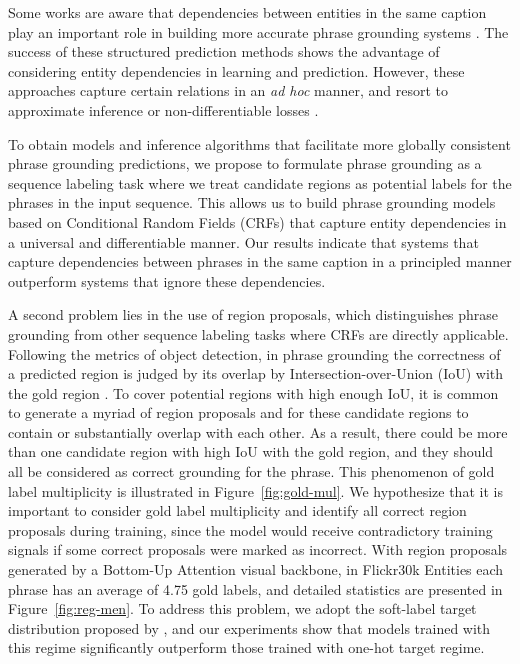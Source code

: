 \documentclass[11pt,a4paper]{article}
\begin{document}
Some works are aware that dependencies between entities in the same caption play an important role in building more accurate phrase grounding systems \cite{DBLP:conf/eccv/WangAKMD16, DBLP:conf/iccv/PlummerMCHL17, DBLP:conf/iccv/ChenKN17}. The success of these structured prediction methods shows the advantage of considering entity dependencies in learning and prediction. However, these approaches capture certain relations in an \textit{ad hoc} manner, and resort to approximate inference \cite{DBLP:conf/eccv/WangAKMD16, DBLP:conf/iccv/PlummerMCHL17} or non-differentiable losses \cite{DBLP:conf/iccv/ChenKN17}. 

To obtain models and inference algorithms that facilitate more globally consistent phrase grounding predictions, we propose to formulate phrase grounding as a sequence labeling task where we treat candidate regions as potential labels for the phrases in the input sequence. This allows us to build phrase grounding models based on Conditional Random Fields (CRFs) \cite{DBLP:conf/icml/LaffertyMP01} that capture entity dependencies in a universal and differentiable manner.  Our results indicate that systems that capture dependencies between phrases in the same caption in a principled manner outperform systems that ignore these dependencies. 

A second problem lies in the use of region proposals, which distinguishes phrase grounding from other sequence labeling tasks where CRFs are directly applicable. Following the metrics of object detection, in phrase grounding the correctness of a predicted region is judged by its overlap by Intersection-over-Union (IoU) with the gold region \cite{DBLP:journals/ijcv/PlummerWCCHL17}. To cover potential regions with high enough IoU, it is common to generate a myriad of region proposals and for these candidate regions to contain or substantially overlap with each other. As a result, there could be more than one candidate region with high IoU with the gold region, and they should all be considered as correct grounding for the phrase. This phenomenon of gold label multiplicity is illustrated in Figure~\ref{fig:gold-mul}. We hypothesize that it is important to consider gold label multiplicity and identify all correct region proposals during training, since the model would receive contradictory training signals if some correct proposals were marked as incorrect. With region proposals generated by a Bottom-Up Attention \cite{DBLP:conf/cvpr/00010BT0GZ18} visual backbone, in Flickr30k Entities each phrase has an average of 4.75 gold labels, and detailed statistics are presented in Figure~\ref{fig:reg-men}. To address this problem, we adopt the soft-label target distribution proposed by \citet{DBLP:conf/ijcai/YuYXZ0T18}, and our experiments show that models trained with this regime significantly outperform those trained with one-hot target regime. 
\end{document}
